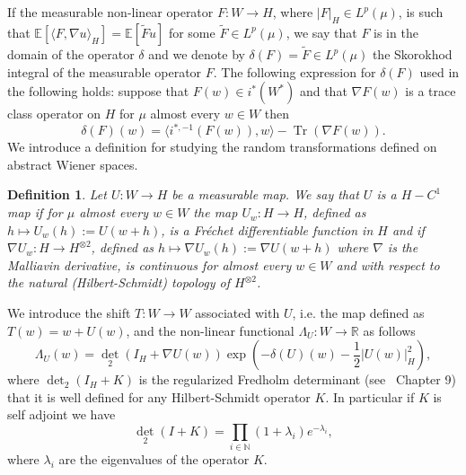 \documentclass[a4paper,10pt]{article}
\newcommand{\assign}{:=}
\newcommand{\asterisk}{\mathord{*}}
\newcommand{\tmop}[1]{\ensuremath{\operatorname{#1}}}
\newtheorem{definition}[theorem]{Definition}
\begin{document}
If the measurable non-linear operator $F : W \rightarrow H$, where $| F |_H
\in L^p (\mu)$, is such that $\mathbb{E} [\langle F, \nabla u \rangle_H]
=\mathbb{E} [\tilde{F} u]$ for some $\tilde{F} \in L^p (\mu)$, we say that $F$
is in the domain of the operator $\delta$ and we denote by $\delta (F) =
\tilde{F} \in L^p (\mu)$ the Skorokhod integral of the measurable operator
$F$. The following expression for $\delta (F)$ used in the following holds:
suppose that $F (w) \in i^{\asterisk} (W^{\ast})$ and that $\nabla F (w)$ is a
trace class operator on $H$ for $\mu$ almost every $w \in W$ then
\begin{equation}
  \delta (F) (w) = \langle i^{\asterisk, - 1} (F (w)), w \rangle - \tmop{Tr}
  (\nabla F (w)) . \label{equationwienerspace1}
\end{equation}
We introduce a definition for studying the random transformations defined on
abstract Wiener spaces.

\begin{definition}
  Let $U : W \rightarrow H$ be a measurable map. We say that $U$ is a $H -
  C^1$ map if for $\mu$ almost every $w \in W$ the map $U_w : H \rightarrow
  H$, defined as $h \longmapsto U_w (h) \assign U (w + h)$, is a Fr{\'e}chet
  differentiable function in $H$ and if $\nabla U_w : H \rightarrow H^{\otimes
  2}$, defined as $h \longmapsto \nabla U_w (h) \assign \nabla U (w + h)$
  where $\nabla$ is the Malliavin derivative, is continuous for almost every
  $w \in W$ and with respect to the natural (Hilbert-Schmidt) topology of
  $H^{\otimes 2}$.
\end{definition}

We introduce the shift $T : W \rightarrow W$ associated with $U$, i.e. the map
defined as $T (w) = w + U (w)$, and the non-linear functional $\Lambda_U : W
\rightarrow \mathbb{R}$ as follows
\begin{equation}
  \Lambda_U (w) = \det_2 (I_H + \nabla U (w)) \exp \left( - \delta (U) (w) -
  \frac{1}{2} | U (w) |_H^2 \right), \label{equationwienerspace2}
\end{equation}
where $\det_2 (I_H + K)$ is the regularized Fredholm determinant
(see~{\cite{Simon2005}} Chapter 9) that it is well defined for any
Hilbert-Schmidt operator $K$. In particular if $K$ is self adjoint we have
\[ \det_2 (I + K) = \prod_{i \in \mathbb{N}} (1 + \lambda_i) e^{- \lambda_i},
\]
where $\lambda_i$ are the eigenvalues of the operator $K$.
\end{document}
